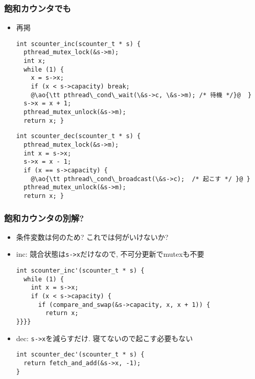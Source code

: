 \documentclass[12pt,dvipdfmx]{beamer}
\begin{document}
\begin{frame}[fragile]
  \frametitle{飽和カウンタでも}
  \begin{itemize}
  \item 再掲
\begin{lstlisting}
int scounter_inc(scounter_t * s) {
  pthread_mutex_lock(&s->m);
  int x;
  while (1) {
    x = s->x;
    if (x < s->capacity) break;
    @\ao{\tt pthread\_cond\_wait(\&s->c, \&s->m); /* 待機 */}@  }
  s->x = x + 1;
  pthread_mutex_unlock(&s->m);
  return x; }
\end{lstlisting}

\begin{lstlisting}
int scounter_dec(scounter_t * s) {
  pthread_mutex_lock(&s->m);
  int x = s->x;
  s->x = x - 1;
  if (x == s->capacity) {
    @\ao{\tt pthread\_cond\_broadcast(\&s->c);  /* 起こす */ }@ }
  pthread_mutex_unlock(&s->m);
  return x; }
\end{lstlisting}

\end{itemize}
\end{frame}

\begin{frame}[fragile]
  \frametitle{飽和カウンタの別解?}
  \begin{itemize}
  \item 条件変数は何のため? これでは何がいけないか?
    
  \item inc: 競合状態は{\tt s->x}だけなので, 不可分更新でmutexも不要
\begin{lstlisting}
int scounter_inc'(scounter_t * s) {
  while (1) {
    int x = s->x;
    if (x < s->capacity) {
      if (compare_and_swap(&s->capacity, x, x + 1)) {
        return x;
}}}}
\end{lstlisting}

\item dec: {\tt s->x}を減らすだけ. 寝てないので起こす必要もない
\begin{lstlisting}
int scounter_dec'(scounter_t * s) {
  return fetch_and_add(&s->x, -1);
}
\end{lstlisting}
\end{itemize}
\end{frame}
\end{document}
